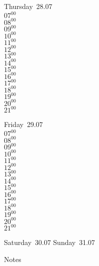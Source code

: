 \documentclass[11pt,a4paper]{book}\usepackage[]{graphicx}\usepackage[]{color}
\begin{document}
\clearpage
\begin{headerbox}
\end{headerbox}
\begin{weekdaybox}
  Thursday~28.07\\
  { 
  \vfill
  $07^{00}$\\
$08^{00}$\\
$09^{00}$\\
$10^{00}$\\
$11^{00}$\\
$12^{00}$\\
$13^{00}$\\
$14^{00}$\\
$15^{00}$\\
$16^{00}$\\
$17^{00}$\\
$18^{00}$\\
$19^{00}$\\
$20^{00}$\\
$21^{00}$\\
  }
\end{weekdaybox} 
\begin{weekdaybox}
  Friday~29.07\\
  { 
  \vfill
  $07^{00}$\\
$08^{00}$\\
$09^{00}$\\
$10^{00}$\\
$11^{00}$\\
$12^{00}$\\
$13^{00}$\\
$14^{00}$\\
$15^{00}$\\
$16^{00}$\\
$17^{00}$\\
$18^{00}$\\
$19^{00}$\\
$20^{00}$\\
$21^{00}$\\
  }
\end{weekdaybox}
\begin{weekendbox}
  Saturday~30.07
  \tcblower
  Sunday~31.07
\end{weekendbox} %
\begin{notebox}
  Notes
\end{notebox}
\clearpage
\end{document}

